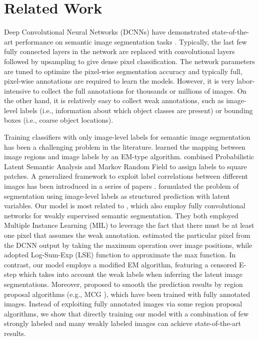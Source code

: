 \section{Related Work}
Deep Convolutional Neural Networks (DCNNs) have demonstrated state-of-the-art performance on semantic image segmentation tasks \citep{eigen2014predicting, long2014fully, mostajabi2014feedforward, chen2014semantic}. Typically, the last few fully connected layers in the network are replaced with convolutional layers followed by upsampling \citep{long2014fully, papandreou2014untangling} to give dense pixel classification. The network parameters are tuned to optimize the pixel-wise segmentation accuracy and typically full, pixel-wise annotations are required to learn the models. However, it is very labor-intensive to collect the full annotations for thousands or millions of images. On the other hand, it is relatively easy to collect weak annotations, such as image-level labels (i.e., information about which object classes are present) or bounding boxes (i.e., coarse object locations).

Training classifiers with only image-level labels for semantic image segmentation has been a challenging problem in the literature. \citet{duygulu2002object} learned the mapping between image regions and image labels by an EM-type algorithm. \citet{verbeek2007region} combined Probabilistic Latent Semantic Analysis and Markov Random Field to assign labels to square patches. A generalized framework to exploit label correlations between different images has been introduced in a series of papers \citep{vezhnevets2010towards, vezhnevets2011weakly, vezhnevets2012weakly}. \citet{xu2014tell} formulated the problem of segmentation using image-level labels as structured prediction with latent variables. Our model is most related to \citet{pathak2014fully, pinheiro2014weakly}, which also employ fully convolutional networks for weakly supervised semantic segmentation. They both employed Multiple Instance Learning (MIL) to leverage the fact that there must be at least one pixel that assumes the weak annotation. \citet{pathak2014fully} estimated the particular pixel from the DCNN output by taking the maximum operation over image positions, while \citet{pinheiro2014weakly} adopted Log-Sum-Exp (LSE) function to approximate the max function. In contrast, our model employs a modified EM algorithm, featuring a censored E-step which takes into account the weak labels when inferring the latent image segmentations. Moreover, \citet{pinheiro2014weakly} proposed to smooth the prediction results by region proposal algorithms (e.g., MCG \citep{arbelaez2014multiscale}), which have been trained with fully annotated images. Instead of exploiting fully annotated images via some region proposal algorithms, we show that directly training our model with a combination of few strongly labeled and many weakly labeled images can achieve state-of-the-art results.

